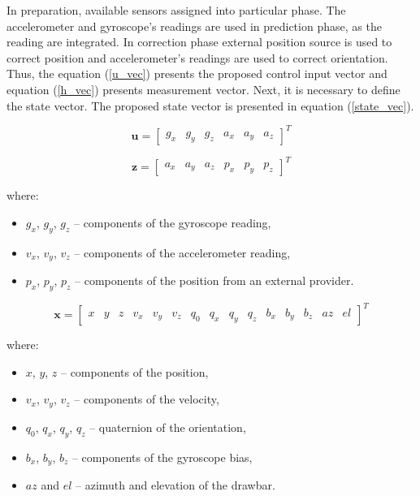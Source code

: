 In preparation, available sensors assigned into particular phase. The accelerometer and gyroscope's readings are used in prediction phase, as the reading are integrated. In correction phase external position source is used to correct position and accelerometer's readings are used to correct orientation.  Thus, the equation (\ref{u_vec}) presents the proposed control input vector and equation (\ref{h_vec}) presents measurement vector. Next, it is necessary to define the state vector. The proposed state vector is presented in equation (\ref{state_vec}).

\begin{equation}
	\bm{u} = \begin{bmatrix}
		g_x & g_y & g_z & a_x & a_y & a_z
	\end{bmatrix}^T
	\label{u_vec}
\end{equation}

\begin{equation}
	\bm{z} = \begin{bmatrix}
		a_x & a_y & a_z & p_x & p_y & p_z
	\end{bmatrix}^T
	\label{h_vec}
\end{equation}

where:
\begin{itemize}
	\item $g_x$, $g_y$, $g_z$ -- components of the gyroscope reading,
	\item $v_x$, $v_y$, $v_z$ -- components of the accelerometer reading,
	\item $p_x$, $p_y$, $p_z$ -- components of the position from an external provider.
\end{itemize}

\begin{equation}
	\bm{x} = \begin{bmatrix}
	x & y & z & v_x & v_y & v_z & q_0 & q_x & q_y & q_z & b_x & b_y & b_z & az & el
	\end{bmatrix}^T
	\label{state_vec}
\end{equation}

where:
\begin{itemize}
	\item $x$, $y$, $z$ -- components of the position,
	\item $v_x$, $v_y$, $v_z$ -- components of the velocity,
	\item $q_0$, $q_x$, $q_y$, $q_z$ -- quaternion of the orientation,
	\item $b_x$, $b_y$, $b_z$ -- components of the gyroscope bias,
	\item $az$ and $el$ -- azimuth and elevation of the drawbar.
\end{itemize}

